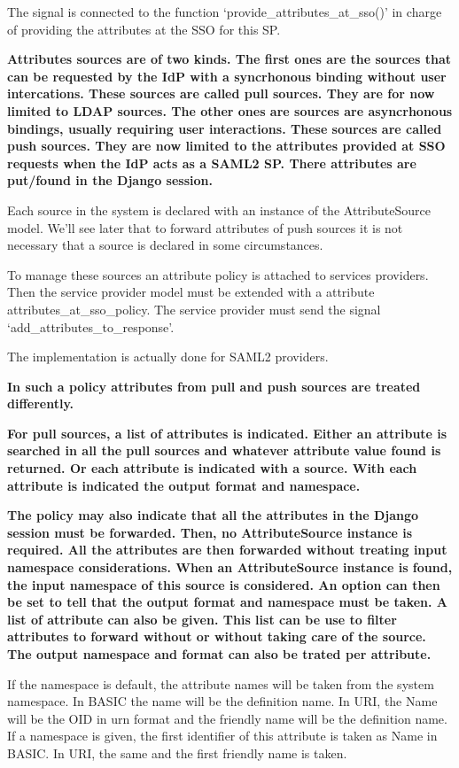 \documentclass[letterpaper,10pt,english]{sphinxmanual}
\begin{document}
The signal is connected to the function `provide\_attributes\_at\_sso()' in
charge of providing the attributes at the SSO for this SP.

\textbf{Attributes sources are of two kinds. The first ones are the sources that can
be requested by the IdP with a syncrhonous binding without user intercations.
These sources are called pull sources. They are for now limited to LDAP
sources. The other ones are sources are asyncrhonous bindings, usually
requiring user interactions. These sources are called push sources. They are
now limited to the attributes provided at SSO requests when the IdP acts as a
SAML2 SP. There attributes are put/found in the Django session.}

Each source in the system is declared with an instance of the AttributeSource
model. We'll see later that to forward attributes of push sources it is not
necessary that a source is declared in some circumstances.

To manage these sources an attribute policy is attached to services providers.
Then the service provider model must be extended with a attribute
attributes\_at\_sso\_policy. The service provider must send the signal
`add\_attributes\_to\_response'.

The implementation is actually done for SAML2 providers.

\textbf{In such a policy attributes from pull and push sources are treated
differently.}

\textbf{For pull sources, a list of attributes is indicated. Either an attribute is
searched in all the pull sources and whatever attribute value found is
returned. Or each attribute is indicated with a source. With each attribute is
indicated the output format and namespace.}

\textbf{The policy may also indicate that all the attributes in the Django session
must be forwarded. Then, no AttributeSource instance is required. All the
attributes are then forwarded without treating input namespace considerations.
When an AttributeSource instance is found, the input namespace of this source
is considered. An option can then be set to tell that the output format and
namespace must be taken. A list of attribute can also be given.
This list can be use to filter attributes to forward without or without taking
care of the source. The output namespace and format can also be trated per
attribute.}

If the namespace is default, the attribute names will be taken from the
system namespace. In BASIC the name will be the definition name. In URI, the
Name will be the OID in urn format and the friendly name will be the
definition name. If a namespace is given, the first identifier of this
attribute is taken as Name in BASIC. In URI, the same and the first friendly
name is taken.
\end{document}
